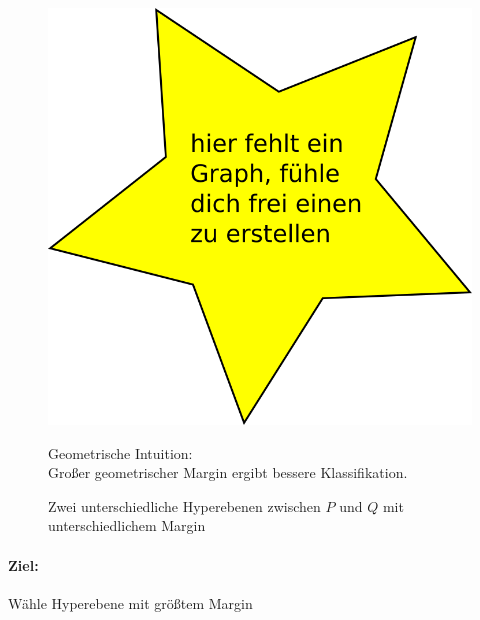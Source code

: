 		\begin{figure}[H]
			\centering
			\begin{minipage}[]{0.45\linewidth}
				\centering
				\includegraphics[width=.75\linewidth]{graphs/dummy}
				\caption{Zwei unterschiedliche Hyperebenen zwischen $ P $ und $ Q $ mit unterschiedlichem Margin}
			\end{minipage}
			\hfill
			\begin{minipage}[]{0.45\linewidth}
				Geometrische Intuition:\\
				Großer geometrischer Margin ergibt bessere Klassifikation.
			\end{minipage}%
		\end{figure}
		
	\paragraph*{Ziel:}	
		Wähle Hyperebene mit größtem Margin\\
		\begin{center}
		\end{center}
		
